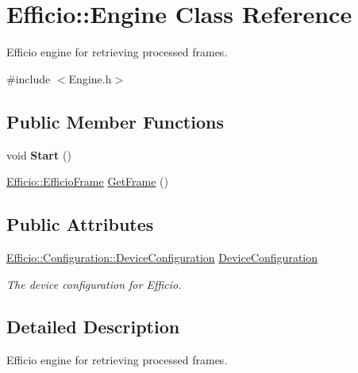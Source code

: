\hypertarget{class_efficio_1_1_engine}{}\section{Efficio\+:\+:Engine Class Reference}
\label{class_efficio_1_1_engine}


Efficio engine for retrieving processed frames.  




{\ttfamily \#include $<$Engine.\+h$>$}

\subsection*{Public Member Functions}
\begin{DoxyCompactItemize}
\item 
void {\bfseries Start} ()\hypertarget{class_efficio_1_1_engine_a3b6e5c963c14df6e902f72df6a521fd1}{}\label{class_efficio_1_1_engine_a3b6e5c963c14df6e902f72df6a521fd1}

\item 
\hyperlink{class_efficio_1_1_efficio_frame}{Efficio\+::\+Efficio\+Frame} \hyperlink{class_efficio_1_1_engine_a9496aecb7bd8826739fbd5b7d5299ff8}{Get\+Frame} ()
\end{DoxyCompactItemize}
\subsection*{Public Attributes}
\begin{DoxyCompactItemize}
\item 
\hyperlink{class_efficio_1_1_configuration_1_1_device_configuration}{Efficio\+::\+Configuration\+::\+Device\+Configuration} \hyperlink{class_efficio_1_1_engine_afbaba10c9c508bdcc16625a2e51a6148}{Device\+Configuration}\hypertarget{class_efficio_1_1_engine_afbaba10c9c508bdcc16625a2e51a6148}{}\label{class_efficio_1_1_engine_afbaba10c9c508bdcc16625a2e51a6148}

\begin{DoxyCompactList}\small\item\em The device configuration for Efficio. \end{DoxyCompactList}\end{DoxyCompactItemize}


\subsection{Detailed Description}
Efficio engine for retrieving processed frames. 

